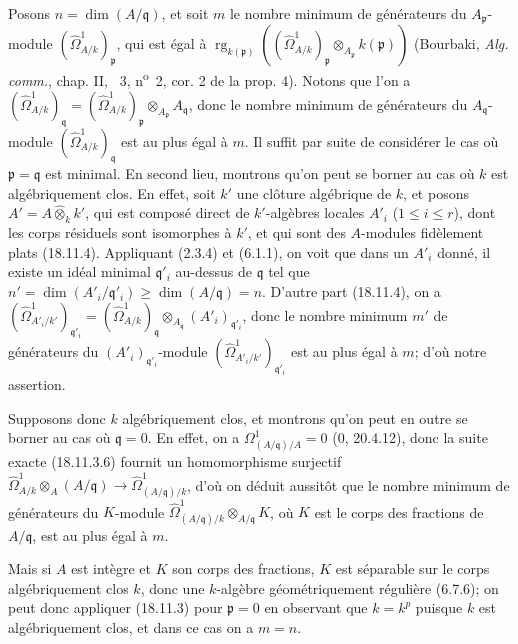 Posons $n=\dim(A/\mathfrak q)$, et soit $m$ le nombre minimum de générateurs du $A_{\mathfrak p}$-module $(\hat{\Omega}^1_{A/k})_{\mathfrak p}$, qui est égal à $\operatorname{rg}_{k(\mathfrak p)}((\hat{\Omega}^1_{A/k})_{\mathfrak p}\otimes_{A_{\mathfrak p}}k(\mathfrak p))$ (Bourbaki, \emph{Alg. comm.}, chap. II, \textsection~3, n\textsuperscript{o}~2, cor. 2 de la prop. 4). Notons que l'on a $(\hat{\Omega}^1_{A/k})_{\mathfrak q}=(\hat{\Omega}^1_{A/k})_{\mathfrak p}\otimes_{A_{\mathfrak p}}A_{\mathfrak q}$, donc le nombre minimum de générateurs du $A_{\mathfrak q}$-module $(\hat{\Omega}^1_{A/k})_{\mathfrak q}$ est au plus égal à $m$. Il suffit par suite de considérer le cas où $\mathfrak p=\mathfrak q$ est minimal. En second lieu, montrons qu'on peut se borner au cas où $k$ est algébriquement clos. En effet, soit $k'$ une clôture algébrique de $k$, et posons $A'=A\widehat{\otimes}_k k'$, qui est composé direct de $k'$-algèbres locales $A'_i$ ($1\leq i\leq r$), dont les corps résiduels sont isomorphes à $k'$, et qui sont des $A$-modules fidèlement plats (18.11.4). Appliquant (2.3.4) et (6.1.1), on voit que dans un $A'_i$ donné, il existe un idéal minimal $\mathfrak q'_i$ au-dessus de $\mathfrak q$ tel que $n'=\dim(A'_i/\mathfrak q'_i)\geq\dim(A/\mathfrak q)=n$. D'autre part (18.11.4), on a $(\hat{\Omega}^1_{A'_i/k'})_{\mathfrak q'_i}=(\hat{\Omega}^1_{A/k})_{\mathfrak q}\otimes_{A_{\mathfrak q}}(A'_i)_{\mathfrak q'_i}$, donc le nombre minimum $m'$ de générateurs du $(A'_i)_{\mathfrak q'_i}$-module $(\hat{\Omega}^1_{A'_i/k'})_{\mathfrak q'_i}$ est au plus égal à $m$; d'où notre assertion.

Supposons donc $k$ algébriquement clos, et montrons qu'on peut en outre se borner au cas où $\mathfrak q=0$. En effet, on a $\Omega^1_{(A/\mathfrak q)/A}=0$ (0, 20.4.12), donc la suite exacte (18.11.3.6) fournit un homomorphisme surjectif $\hat{\Omega}^1_{A/k}\otimes_A(A/\mathfrak q)\to\hat{\Omega}^1_{(A/\mathfrak q)/k}$, d'où on déduit aussitôt que le nombre minimum de générateurs du $K$-module $\hat{\Omega}^1_{(A/\mathfrak q)/k}\otimes_{A/\mathfrak q}K$, où $K$ est le corps des fractions de $A/\mathfrak q$, est au plus égal à $m$.

Mais si $A$ est intègre et $K$ son corps des fractions, $K$ est séparable sur le corps algébriquement clos $k$, donc une $k$-algèbre géométriquement régulière (6.7.6); on peut donc appliquer (18.11.3) pour $\mathfrak p=0$ en observant que $k=k^p$ puisque $k$ est algébriquement clos, et dans ce cas on a $m=n$.

